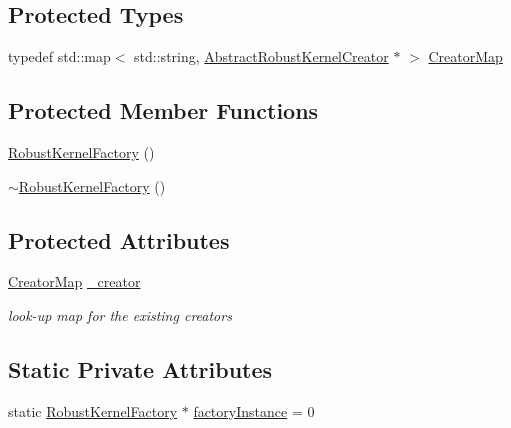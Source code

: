 \subsection*{Protected Types}
\begin{DoxyCompactItemize}
\item 
typedef std\+::map$<$ std\+::string, \mbox{\hyperlink{classg2o_1_1_abstract_robust_kernel_creator}{Abstract\+Robust\+Kernel\+Creator}} $\ast$ $>$ \mbox{\hyperlink{classg2o_1_1_robust_kernel_factory_aa143765542cbf4738e2137d61517b218}{Creator\+Map}}
\end{DoxyCompactItemize}
\subsection*{Protected Member Functions}
\begin{DoxyCompactItemize}
\item 
\mbox{\hyperlink{classg2o_1_1_robust_kernel_factory_af1df5179d6823881c9c3531640029eae}{Robust\+Kernel\+Factory}} ()
\item 
\mbox{\hyperlink{classg2o_1_1_robust_kernel_factory_a4b644b5cbf7f9bec42b8c168e8416011}{$\sim$\+Robust\+Kernel\+Factory}} ()
\end{DoxyCompactItemize}
\subsection*{Protected Attributes}
\begin{DoxyCompactItemize}
\item 
\mbox{\hyperlink{classg2o_1_1_robust_kernel_factory_aa143765542cbf4738e2137d61517b218}{Creator\+Map}} \mbox{\hyperlink{classg2o_1_1_robust_kernel_factory_af5f3cea409d3f18baa40da898d21424b}{\+\_\+creator}}
\begin{DoxyCompactList}\small\item\em look-\/up map for the existing creators \end{DoxyCompactList}\end{DoxyCompactItemize}
\subsection*{Static Private Attributes}
\begin{DoxyCompactItemize}
\item 
static \mbox{\hyperlink{classg2o_1_1_robust_kernel_factory}{Robust\+Kernel\+Factory}} $\ast$ \mbox{\hyperlink{classg2o_1_1_robust_kernel_factory_a598761493f11f50bee72b4799fab050e}{factory\+Instance}} = 0
\end{DoxyCompactItemize}


